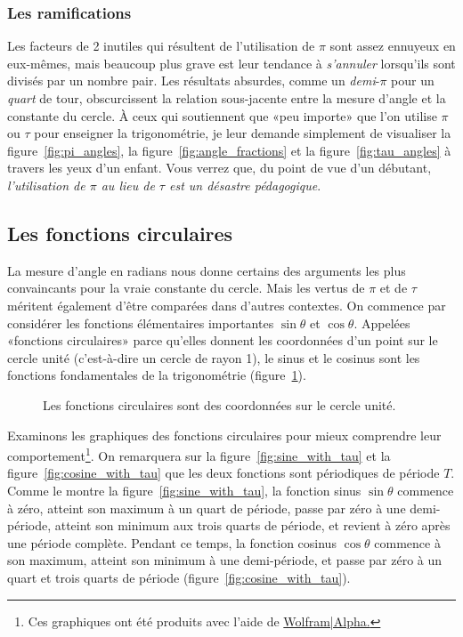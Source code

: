     \subsubsection{Les ramifications} %
    \label{sec:the_ramifications}


Les facteurs de 2 inutiles qui résultent de l'utilisation de $\pi$ sont assez
ennuyeux en eux-mêmes, mais beaucoup plus grave est leur tendance à
\emph{s'annuler} lorsqu'ils sont divisés par un nombre pair. Les résultats
absurdes, comme un \emph{demi}-$\pi$ pour un \emph{quart} de tour, obscurcissent
la relation sous-jacente entre la mesure d'angle et la constante du cercle. À
ceux qui soutiennent que «\ns peu importe\ns » que l'on utilise $\pi$ ou $\tau$ pour
enseigner la trigonométrie, je leur demande simplement de visualiser la
figure~\ref{fig:pi_angles}, la figure~\ref{fig:angle_fractions} et la
figure~\ref{fig:tau_angles} à travers les yeux d'un enfant. Vous verrez que, du
point de vue d'un débutant, \emph{l'utilisation de $\pi$ au lieu de $\tau$ est
un désastre pédagogique}.

  \subsection{Les fonctions circulaires} %
  \label{sec:the_circle_functions}

La mesure d'angle en radians nous donne certains des arguments les plus
convaincants pour la vraie constante du cercle. Mais les vertus de $\pi$ et de $\tau$
méritent également d'être comparées dans d'autres contextes. On commence par
considérer les fonctions élémentaires importantes $\sin\theta$ et $\cos\theta$.
Appelées «\ns fonctions circulaires\ns » parce qu'elles donnent les
coordonnées d'un point sur le cercle unité (c'est-à-dire un cercle de rayon 1),
le sinus et le cosinus sont les fonctions fondamentales de la trigonométrie
(figure~\ref{fig:circle_functions}).

\begin{figure}
\begin{center}
\end{center}
\caption{Les fonctions circulaires sont des coordonnées sur le cercle
unité.\label{fig:circle_functions}}
\end{figure}

Examinons les graphiques des fonctions circulaires pour mieux comprendre
leur comportement\footnote{Ces graphiques ont été produits avec l'aide de
\href{https://www.wolframalpha.com/}{Wolfram|Alpha.}}. On remarquera sur la
figure~\ref{fig:sine_with_tau} et la figure~\ref{fig:cosine_with_tau} que les
deux fonctions sont périodiques de période $T$. Comme le montre la
figure~\ref{fig:sine_with_tau}, la fonction sinus $\sin\theta$ commence à zéro,
atteint son maximum à un quart de période, passe par zéro à une demi-période,
atteint son minimum aux trois quarts de période, et revient à zéro après une
période complète. Pendant ce temps, la fonction cosinus $\cos\theta$ commence à
son maximum, atteint son minimum à une demi-période, et passe par zéro à un quart et
trois quarts de période (figure~\ref{fig:cosine_with_tau}).

